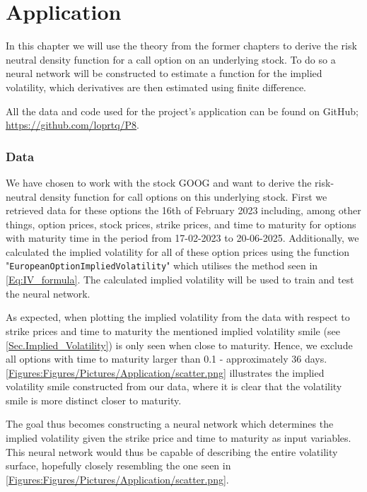 \chapter{Application}\label{Ch.5}
In this chapter we will use the theory from the former chapters to derive the risk neutral density function for a call option on an underlying stock. To do so a neural network will be constructed to estimate a function for the implied volatility, which derivatives are then estimated using finite difference.

All the data and code used for the project's application can be found on GitHub; \url{https://github.com/loprtq/P8}.


\subsection*{Data}
We have chosen to work with the stock GOOG and want to derive the risk-neutral density function for call options on this underlying stock. First we retrieved data for these options the 16th of February 2023 including, among other things, option prices, stock prices, strike prices, and time to maturity for options with maturity time in the period from 17-02-2023 to 20-06-2025. Additionally, we calculated the implied volatility for all of these option prices using the function "\lstinline{EuropeanOptionImpliedVolatility}" which utilises the method seen in \eqref{Eq:IV_formula}. The calculated implied volatility will be used to train and test the neural network.

As expected, when plotting the implied volatility from the data with respect to strike prices and time to maturity the mentioned implied volatility smile (see \autoref{Sec.Implied_Volatility}) is only seen when close to maturity. Hence, we exclude all options with time to maturity larger than 0.1 - approximately 36 days. \autoref{Figures:Figures/Pictures/Application/scatter.png} illustrates the implied volatility smile constructed from our data, where it is clear that the volatility smile is more distinct closer to maturity. 

The goal thus becomes constructing a neural network which determines the implied volatility given the strike price and time to maturity as input variables. This neural network would thus be capable of describing the entire volatility surface, hopefully closely resembling the one seen in \autoref{Figures:Figures/Pictures/Application/scatter.png}.


